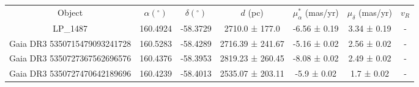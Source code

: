 \begin{table}
\begin{tabular}{ccccccc}
Object & $\alpha (^\circ)$ & $\delta (^\circ)$ & $d$ (pc) & $\mu_{\alpha}^*$ (mas/yr) & $\mu_{\delta}$ (mas/yr) & $v_R$ \\
LP_1487 & 160.4924 & -58.3729 & 2710.0 ± 177.0 & -6.56 ± 0.19 & 3.34 ± 0.19 & - \\
Gaia DR3 5350715479093241728 & 160.5283 & -58.4289 & 2716.39 ± 241.67 & -5.16 ± 0.02 & 2.56 ± 0.02 & - \\
Gaia DR3 5350727367562696576 & 160.4376 & -58.3953 & 2819.23 ± 260.45 & -8.08 ± 0.02 & 2.49 ± 0.02 & - \\
Gaia DR3 5350727470642189696 & 160.4239 & -58.4013 & 2535.07 ± 203.11 & -5.9 ± 0.02 & 1.7 ± 0.02 & - \\
\end{tabular}
\end{table}
